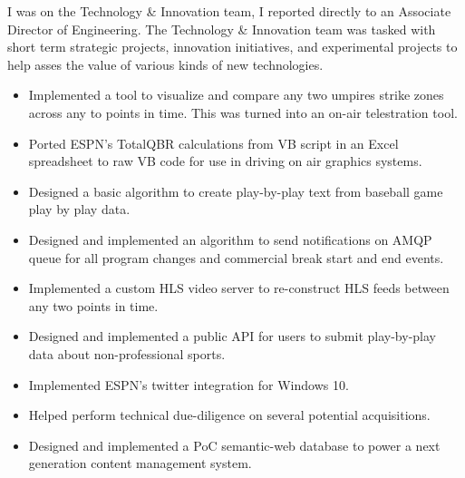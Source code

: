 \documentclass{article}
\begin{document}
\vspace{3pt} I was on the Technology \& Innovation team, I reported directly to an Associate Director of Engineering. The Technology \& Innovation team was tasked with short term strategic projects,
innovation initiatives, and experimental projects to help asses the value of various kinds of new technologies. 
\vspace{3pt}\begin{multicols}{2}
  \begin{small}
    \begin{itemize}[leftmargin=*,label=\tiny{$\bullet$}]
    \item\begin{minipage}[t]{\linewidth}{Implemented a tool to visualize and compare any two umpires strike zones across any to points in time. This was turned into an on-air telestration tool.}\end{minipage}
    \item\begin{minipage}[t]{\linewidth}{Ported ESPN's TotalQBR calculations from VB script in an Excel spreadsheet to raw VB code for use in driving on air graphics systems.}\end{minipage}
    \item\begin{minipage}[t]{\linewidth}{Designed a basic algorithm to create play-by-play text from baseball game play by play data.}\end{minipage}
    \item\begin{minipage}[t]{\linewidth}{Designed and implemented an algorithm to send notifications on AMQP queue for all program changes and commercial break start and end events.}\end{minipage}
    \item\begin{minipage}[t]{\linewidth}{Implemented a custom HLS video server to re-construct HLS feeds between any two points in time.}\end{minipage}
    \item\begin{minipage}[t]{\linewidth}{Designed and implemented a public API for users to submit play-by-play data about non-professional sports.}\end{minipage}
    \item\begin{minipage}[t]{\linewidth}{Implemented ESPN's twitter integration for Windows 10.}\end{minipage}
    \item\begin{minipage}[t]{\linewidth}{Helped perform technical due-diligence on several potential acquisitions.}\end{minipage}
    \item\begin{minipage}[t]{\linewidth}{Designed and implemented a PoC semantic-web database to power a next generation content management system.}\end{minipage}
    \end{itemize}
  \end{small} 
\end{multicols}
\end{document}
